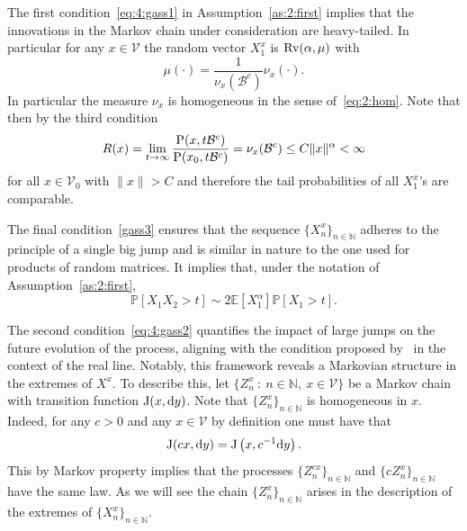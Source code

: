 \documentclass[preprint,12pt]{elsarticle}
\theoremstyle{definition}
\theoremstyle{remark}
\newcommand{\xbf}{{ x}}
\newcommand{\ybf}{{ y}}
\newcommand{\Xbf}{{ X}}
\newcommand{\Zbf}{{ Z}}
\newcommand{\1}{{\mathbf 1}}
\numberwithin{equation}{section}
\newcommand{\Nbb}{\mathbb{N}}
\newcommand{\ud}{{\rm d}}
\newcommand{\Prm}{{\rm P}}
\newcommand{\Krm}{{\rm J}}
\newcommand{\Rvrm}{{\rm Rv}}
\newcommand{\Vcal}{\mathcal{V}}
\newcommand{\Bcal}{\mathcal{B}}
\begin{document}
  The first condition~\eqref{eq:4:gass1} in Assumption~\ref{as:2:first} implies 
  that the innovations in the Markov 
  chain under consideration are heavy-tailed. In particular for any $x \in \mathcal{V}$
  the random vector $\Xbf_1^x$ is $\Rvrm(\alpha, \mu)$ with 
  \begin{equation*}
    \mu(\cdot) = \frac{1}{\nu_x\left(\mathcal{B}^c\right)} \nu_x(\cdot).
  \end{equation*}
  In particular the measure $\nu_x$ is homogeneous in the sense of~\eqref{eq:2:hom}.
  Note that then by the third condition
  \begin{equation}\label{eq:3:defR} 
    R(x) = \lim_{t \to \infty} \frac{\Prm(x, t \Bcal^c)}{\Prm(x_0, t \Bcal^c)}
	= \nu_x ( \Bcal^c) \leq C \|x\|^\alpha <\infty
  \end{equation}
  for all $x \in \mathcal{V}_0$ with $\|x\| >C$
  and therefore the tail probabilities of all $X_1^x$'s are comparable.

  The final condition~\eqref{gass3} 
  ensures that the sequence $\{X_n^x\}_{n \in \mathbb{N}}$ 
  adheres to the principle of a single big jump and is similar in nature to the one used for products of random matrices. It implies that, under the notation of Assumption~\ref{as:2:first},
  \begin{equation*}
      \mathbb{P}[X_1X_2>t] \sim 2 \mathbb{E}[X_1^\alpha] \mathbb{P}[X_1>t].
  \end{equation*}
	
  The second condition~\eqref{eq:4:gass2} quantifies the 
  impact of large jumps on the future evolution of the process, 
  aligning with the condition proposed by~\cite{resnick2013asymptotics} in 
  the context of the real line. 
  Notably, this framework reveals a Markovian structure in the extremes of $\Xbf^\xbf$.
  To describe this, let $\{\Zbf_n^\xbf \: : \: n\in \mathbb{N}, \: x \in \Vcal\}$
  be a Markov chain with transition function $\Krm(\xbf, \ud \ybf)$.
  Note that $\{\Zbf_n^\xbf\}_{ n \in \Nbb}$ is homogeneous in $\xbf$. 
  Indeed, for any $c>0$ and any $\xbf \in \Vcal$ by definition 
  one must have that 
  \begin{equation*}
    \Krm(c \xbf, \ud \ybf) = \Krm\left( \xbf, c^{-1}\ud \ybf \right).
  \end{equation*}
  This by Markov property implies that
  the processes $\{\Zbf_n^{c\xbf}\}_{n \in \mathbb{N}}$ and 
  $\{c\Zbf_n^{\xbf}\}_{n \in \mathbb{N}}$ have the same law. 
  As we will see the chain
  $\{\Zbf_n^{\xbf}\}_{n \in \mathbb{N}}$ arises in the description of the extremes
  of $\{\Xbf_n^{\xbf}\}_{n \in \mathbb{N}}$.
\end{document}

